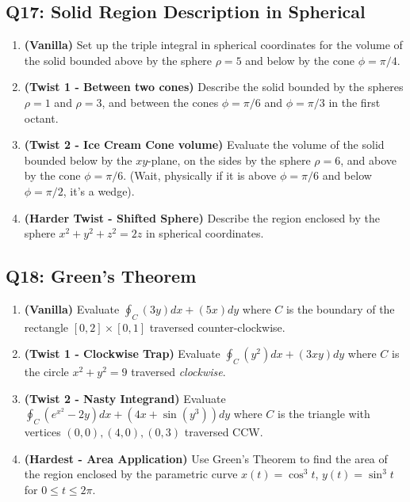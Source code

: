 \documentclass[11pt]{article}
\begin{document}
\subsection{Q17: Solid Region Description in Spherical}
\begin{enumerate}[label=\textbf{17\alph*.}]
    \item \textbf{(Vanilla)} Set up the triple integral in spherical coordinates for the volume of the solid bounded above by the sphere $\rho = 5$ and below by the cone $\phi = \pi/4$.
    \item \textbf{(Twist 1 - Between two cones)} Describe the solid bounded by the spheres $\rho=1$ and $\rho=3$, and between the cones $\phi = \pi/6$ and $\phi = \pi/3$ in the first octant.
    \item \textbf{(Twist 2 - Ice Cream Cone volume)} Evaluate the volume of the solid bounded below by the $xy$-plane, on the sides by the sphere $\rho = 6$, and above by the cone $\phi = \pi/6$. (Wait, physically if it is above $\phi=\pi/6$ and below $\phi=\pi/2$, it's a wedge).
    \item \textbf{(Harder Twist - Shifted Sphere)} Describe the region enclosed by the sphere $x^2+y^2+z^2 = 2z$ in spherical coordinates.
\end{enumerate}

\subsection{Q18: Green's Theorem}
\begin{enumerate}[label=\textbf{18\alph*.}]
    \item \textbf{(Vanilla)} Evaluate $\oint_C (3y) dx + (5x) dy$ where $C$ is the boundary of the rectangle $[0,2] \times [0,1]$ traversed counter-clockwise.
    \item \textbf{(Twist 1 - Clockwise Trap)} Evaluate $\oint_C (y^2) dx + (3xy) dy$ where $C$ is the circle $x^2+y^2=9$ traversed \textit{clockwise}.
    \item \textbf{(Twist 2 - Nasty Integrand)} Evaluate $\oint_C (e^{x^2} - 2y) dx + (4x + \sin(y^3)) dy$ where $C$ is the triangle with vertices $(0,0), (4,0), (0,3)$ traversed CCW.
    \item \textbf{(Hardest - Area Application)} Use Green's Theorem to find the area of the region enclosed by the parametric curve $x(t) = \cos^3 t$, $y(t) = \sin^3 t$ for $0 \le t \le 2\pi$.
\end{enumerate}

\newpage
\end{document}

